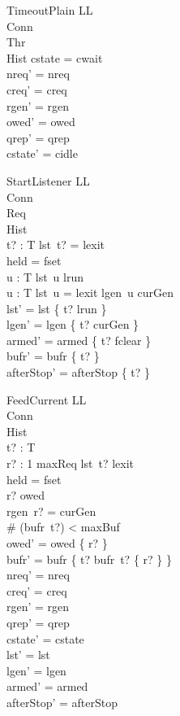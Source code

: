\documentclass[a4paper,10pt,fleqn]{article}
\begin{document}
\begin{schema}{TimeoutPlain}
  \Delta LL \\
  \Xi Conn \\
  \Xi Thr \\
  \Xi Hist
\where
  cstate = cwait \\
  nreq' = nreq \\
  creq' = creq \\
  rgen' = rgen \\
  owed' = owed \\
  qrep' = qrep \\
  cstate' = cidle
\end{schema}

\begin{schema}{StartListener}
  \Delta LL \\
  \Xi Conn \\
  \Xi Req \\
  \Xi Hist \\
  t? : T
\where
  lst~t? = lexit \\
  held = fset \\
  \forall u : T \spot lst~u \neq lrun \\
  \forall u : T \spot lst~u = lexit \lor lgen~u \neq curGen \\
  lst' = lst \oplus \{ t? \mapsto lrun \} \\
  lgen' = lgen \oplus \{ t? \mapsto curGen \} \\
  armed' = armed \oplus \{ t? \mapsto fclear \} \\
  bufr' = bufr \oplus \{ t? \mapsto \emptyset \} \\
  afterStop' = afterStop \oplus \{ t?  \}
\end{schema}

\begin{schema}{FeedCurrent}
  \Delta LL \\
  \Xi Conn \\
  \Xi Hist \\
  t? : T \\
  r? : 1 \upto maxReq
\where
  lst~t? \neq lexit \\
  held = fset \\
  r? \in owed \\
  rgen~r? = curGen \\
  \# (bufr~t?) < maxBuf \\
  owed' = owed \setminus \{ r? \} \\
  bufr' = bufr \oplus \{ t? \mapsto bufr~t? \cup \{ r? \} \} \\
  nreq' = nreq \\
  creq' = creq \\
  rgen' = rgen \\
  qrep' = qrep \\
  cstate' = cstate \\
  lst' = lst \\
  lgen' = lgen \\
  armed' = armed \\
  afterStop' = afterStop
\end{schema}
\end{document}
